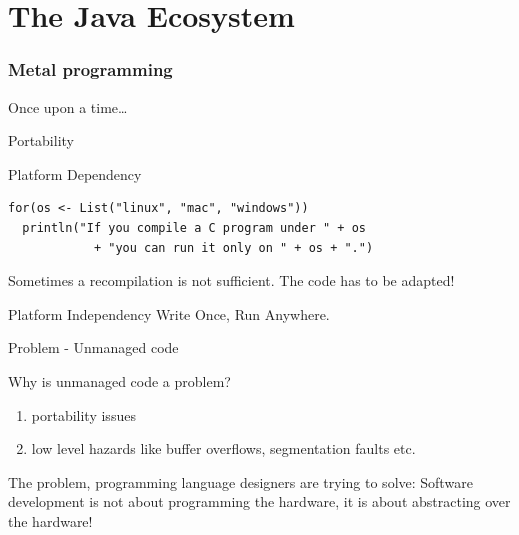 \part[The Java Ecosystem]{The Java Ecosystem}
\section{Metal programming}

\begin{frame}{Once upon a time\ldots}
\end{frame}

\begin{frame}[fragile]{Portability}
\begin{alertblock}{Platform Dependency}
\begin{lstlisting}
for(os <- List("linux", "mac", "windows"))
  println("If you compile a C program under " + os
            + "you can run it only on " + os + ".")
\end{lstlisting}
\end{alertblock}
\pause
Sometimes a recompilation is not sufficient. \alert{The code} has to be adapted!
\pause
\begin{block}{Platform Independency}
Write Once, Run Anywhere.
\end{block}
\end{frame}


\begin{frame}{Problem - Unmanaged code}
\begin{block}{Why is unmanaged code a problem?}
\begin{enumerate}
  \pause
  \item portability issues
  \pause
  \item low level hazards like buffer overflows, segmentation faults etc.
\end{enumerate}
\end{block}
\pause
\begin{alertblock}{The problem, programming language designers are trying to
solve:} Software development is not about programming the hardware, it is about
abstracting over the hardware!
\end{alertblock}
\end{frame}

